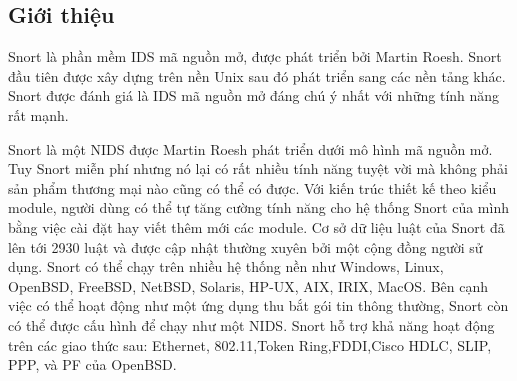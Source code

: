 \subsection{Giới thiệu}
Snort là phần mềm IDS mã nguồn mở, được phát triển bởi Martin Roesh. 
Snort đầu tiên được xây dựng trên nền Unix sau đó phát triển sang các nền tảng khác. 
Snort được đánh giá là IDS mã nguồn mở đáng chú ý nhất với những tính năng rất mạnh.
\par
Snort là một NIDS được Martin Roesh phát triển dưới mô hình mã nguồn mở. 
Tuy Snort miễn phí nhưng nó lại có rất nhiều tính năng tuyệt vời mà không phải sản phẩm thương mại nào cũng có thể có được. 
Với kiến trúc thiết kế theo kiểu module, người dùng có thể tự tăng cường tính năng cho hệ thống Snort của mình bằng việc cài đặt hay viết thêm mới các module. 
Cơ sở dữ liệu luật của Snort đã lên tới 2930 luật và được cập nhật thường xuyên bởi một cộng đồng người sử dụng. 
Snort có thể chạy trên nhiều hệ thống nền như Windows, Linux, OpenBSD, FreeBSD, NetBSD, Solaris, HP-UX, AIX, IRIX, MacOS. Bên cạnh việc có thể hoạt động như một ứng dụng thu bắt gói tin thông  thường, Snort còn có thể được cấu hình để chạy như một NIDS. 
Snort hỗ trợ khả năng hoạt động trên các giao thức sau: Ethernet, 802.11,Token Ring,FDDI,Cisco HDLC, SLIP, PPP, và PF của OpenBSD.

